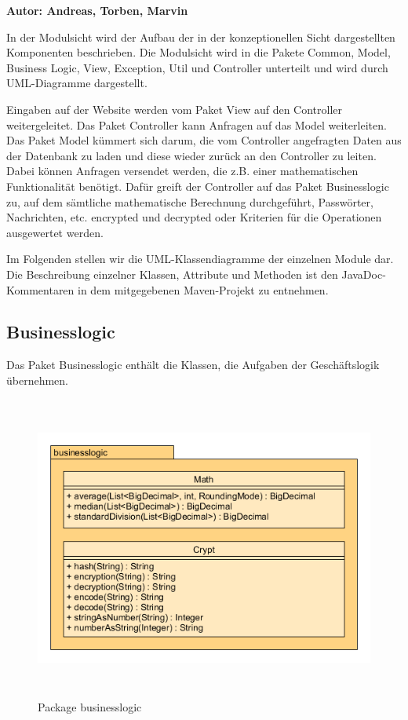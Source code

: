 \textbf{Autor: Andreas, Torben, Marvin}

In der Modulsicht wird der Aufbau der in der konzeptionellen Sicht dargestellten Komponenten beschrieben. Die Modulsicht wird in die Pakete Common, Model, Business Logic, View, Exception, Util und Controller unterteilt und wird durch UML-Diagramme dargestellt.

Eingaben auf der Website werden vom Paket View auf den Controller weitergeleitet. Das Paket Controller kann Anfragen auf das Model weiterleiten. Das Paket Model kümmert sich darum, die vom Controller angefragten Daten aus der Datenbank zu laden und diese wieder zurück an den Controller zu leiten. Dabei können Anfragen versendet werden, die z.B. einer mathematischen Funktionalität benötigt. Dafür greift der Controller auf das Paket Businesslogic zu, auf dem sämtliche mathematische Berechnung durchgeführt, Passwörter, Nachrichten, etc. encrypted und decrypted oder Kriterien für die Operationen ausgewertet werden.

Im Folgenden stellen wir die UML-Klassendiagramme der einzelnen Module dar. Die Beschreibung einzelner Klassen, Attribute und Methoden ist den JavaDoc-Kommentaren in dem mitgegebenen Maven-Projekt zu entnehmen.



\newpage
\subsection{Businesslogic}

Das Paket Businesslogic enthält die Klassen, die Aufgaben der Geschäftslogik übernehmen.

\begin{figure}[H]
	\centering
  \includegraphics[width=\textwidth,height=10cm,keepaspectratio]{../UMLDiagramme/businesslogic/gfx/4_package_businesslogic.png}
	\caption{Package businesslogic}
\end{figure}

